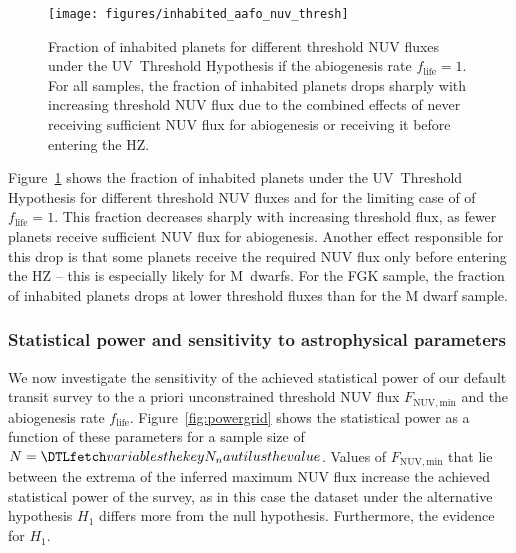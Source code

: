 \documentclass[twocolumn,twocolappendix,linenumbers]{aastex631}
\begin{document}
\begin{figure}
    \begin{centering}
        \texttt{[image: figures/inhabited\_aafo\_nuv\_thresh]}
        \caption{Fraction of inhabited planets for different threshold \gls{NUV} fluxes under the UV~Threshold Hypothesis if the abiogenesis rate $f_\mathrm{life} = 1$.
        For all samples, the fraction of inhabited planets drops sharply with increasing threshold \gls{NUV} flux due to the combined effects of never receiving sufficient \gls{NUV} flux for abiogenesis or receiving it before entering the \gls{HZ}.}
        \label{fig:inhabited_aafo_nuv_thresh}
    \end{centering}
\end{figure}
Figure~\ref{fig:inhabited_aafo_nuv_thresh} shows the fraction of inhabited planets under the UV~Threshold Hypothesis for different threshold \gls{NUV} fluxes and for the limiting case of  of $f_\mathrm{life} = 1$.
This fraction decreases sharply with increasing threshold flux, as fewer planets receive sufficient \gls{NUV} flux for abiogenesis.
Another effect responsible for this drop is that some planets receive the required \gls{NUV} flux only before entering the \gls{HZ} -- this is especially likely for M~dwarfs.
For the FGK sample, the fraction of inhabited planets drops at lower threshold fluxes than for the M dwarf sample.


\subsubsection{Statistical power and sensitivity to astrophysical parameters}\label{sec:results-powergrid}
We now investigate the sensitivity of the achieved statistical power of our default transit survey to the a priori unconstrained threshold \gls{NUV} flux $F_\mathrm{NUV, min}$ and the abiogenesis  rate $f_\mathrm{life}$.
Figure~\ref{fig:powergrid} shows the statistical power as a function of these parameters for a sample size of $N=\var{N_nautilus}$.
Values of $F_\mathrm{NUV, min}$ that lie between the extrema of the inferred maximum \gls{NUV} flux increase the achieved statistical power of the survey, as in this case the dataset under the alternative hypothesis $H_1$ differs more from the null hypothesis.
Furthermore,  the evidence for $H_1$.
\end{document}
